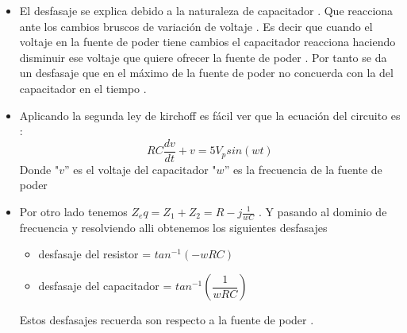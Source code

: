 \documentclass[a4paper,12pt]{article}
\begin{document}
\begin{itemize}
\item El desfasaje se explica debido a la naturaleza de capacitador . Que reacciona ante los cambios bruscos de variación de voltaje . Es decir que cuando el voltaje en la fuente de poder tiene cambios el capacitador reacciona haciendo disminuir ese voltaje que quiere ofrecer la fuente de poder . Por tanto se da un desfasaje que en el máximo de la fuente de poder no concuerda con la del capacitador en el tiempo .  

\item Aplicando la segunda ley de kirchoff es fácil ver que la ecuación del circuito es :  
\begin{equation*}
 RC\dfrac{dv}{dt} + v = 5V_psin(wt) 
\end{equation*}
Donde "$v$'' es el voltaje del capacitador "$w$'' es la frecuencia de la fuente de poder \\


\item Por otro lado tenemos $Z_eq = Z_1 + Z_2 = R - j\frac{1}{wC}$ . Y pasando al dominio de frecuencia y resolviendo alli obtenemos los siguientes desfasajes 

\begin{itemize}
\item desfasaje del resistor = $ tan^{-1}(-wRC)$
\item desfasaje del capacitador = $ tan^{-1}(\dfrac{1}{wRC})$
\end{itemize}
Estos desfasajes recuerda son respecto a la fuente de poder .

\end{itemize}
\end{document}

